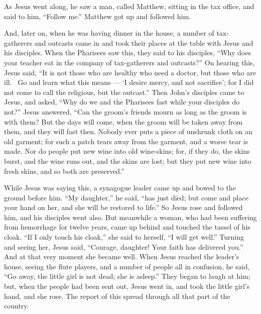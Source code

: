  As Jesus went along, he saw a man, called Matthew, sitting
in the tax office, and said to him, ``Follow me.'' Matthew got up and
followed him.

 And, later on, when he was having dinner in the house, a
number of tax-gatherers and outcasts came in and took their places at
the table with Jesus and his disciples.  When the Pharisees
saw this, they said to his disciples, ``Why does your teacher eat in the
company of tax-gatherers and outcasts?''  On hearing this,
Jesus said, ``It is not those who are healthy who need a doctor, but
those who are ill.~ Go and learn what this means --- `I
desire mercy, and not sacrifice'; for I did not come to call the
religious, but the outcast.''  Then John's disciples came
to Jesus, and asked, ``Why do we and the Pharisees fast while your
disciples do not?''  Jesus answered, ``Can the groom's
friends mourn as long as the groom is with them? But the days will come,
when the groom will be taken away from them, and they will fast then.
 Nobody ever puts a piece of unshrunk cloth on an old
garment; for such a patch tears away from the garment, and a worse tear
is made.  Nor do people put new wine into old wine-skins;
for, if they do, the skins burst, and the wine runs out, and the skins
are lost; but they put new wine into fresh skins, and so both are
preserved.''

 While Jesus was saying this, a synagogue leader came up
and bowed to the ground before him. ``My daughter,'' he said, ``has just
died; but come and place your hand on her, and she will be restored to
life.''  So Jesus rose and followed him, and his disciples
went also.  But meanwhile a woman, who had been suffering
from hemorrhage for twelve years, came up behind and touched the tassel
of his cloak.  ``If I only touch his cloak,'' she said to
herself, ``I will get well.''  Turning and seeing her,
Jesus said, ``Courage, daughter! Your faith has delivered you.'' And at
that very moment she became well.  When Jesus reached the
leader's house, seeing the flute players, and a number of people all in
confusion,  he said, ``Go away, the little girl is not
dead; she is asleep.'' They began to laugh at him;  but,
when the people had been sent out, Jesus went in, and took the little
girl's hand, and she rose.  The report of this spread
through all that part of the country.


